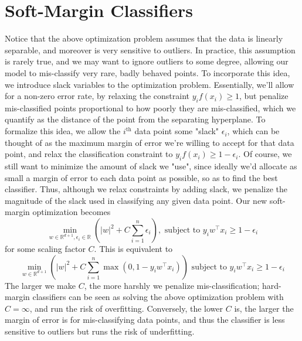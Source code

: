 \documentclass{article}
\begin{document}
\section{Soft-Margin Classifiers}
Notice that the above optimization problem assumes that the data is linearly separable, and moreover is very sensitive to outliers. In practice, this assumption is rarely true, and we may want to ignore outliers to some degree, allowing our model to mis-classify very rare, badly behaved points. To incorporate this idea, we introduce slack variables to the optimization problem. Essentially, we'll allow for a non-zero error rate, by relaxing the constraint $ y_i f(x_i) \geq 1 $, but penalize mis-classified points proportional to how poorly they are mis-classified, which we quantify as the distance of the point from the separating hyperplane.
\newline
To formalize this idea, we allow the $ i^{\text{th}} $ data point some "slack" $ \epsilon_i $, which can be thought of as the maximum margin of error we're willing to accept for that data point, and relax the classification constraint to $ y_i f(x_i) \geq 1 - \epsilon_i $. Of course, we still want to minimize the amount of slack we "use", since ideally we'd allocate as small a margin of error to each data point as possible, so as to find the best classifier. Thus, although we relax constraints by adding slack, we penalize the magnitude of the slack used in classifying any given data point. Our new soft-margin optimization becomes
$$ \min_{w \in \mathbb{R}^{d + 1}, \epsilon_i \in \mathbb{R}} \left( |w|^2 + C \sum_{i = 1}^n \epsilon_i \right), \text{ subject to } y_i w^\intercal x_i \geq 1 - \epsilon_i $$
for some scaling factor $ C $. This is equivalent to
$$ \min_{w \in \mathbb{R}^{d + 1}} \left( |w|^2 + C \sum_{i = 1}^n \max(0, 1 - y_i w^\intercal x_i) \right) \text{ subject to } y_i w^\intercal x_i \geq 1 - \epsilon_i $$
The larger we make $ C $, the more harshly we penalize mis-classification; hard-margin classifiers can be seen as solving the above optimization problem with $ C = \infty $, and run the risk of overfitting. Conversely, the lower $ C $ is, the larger the margin of error is for mis-classifying data points, and thus the classifier is less sensitive to outliers but runs the risk of underfitting.
\end{document}
